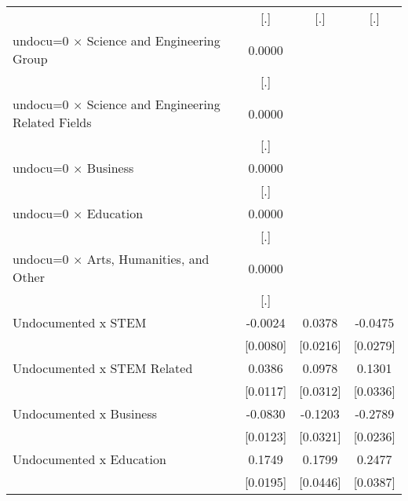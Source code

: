 \begin{table}[htbp]
\begin{tabular}{l*{3}{c}}
                    &         [.]         &         [.]         &         [.]         \\
\addlinespace
undocu=0 $\times$ Science and Engineering Group&      0.0000         &                     &                     \\
                    &         [.]         &                     &                     \\
\addlinespace
undocu=0 $\times$ Science and Engineering Related Fields&      0.0000         &                     &                     \\
                    &         [.]         &                     &                     \\
\addlinespace
undocu=0 $\times$ Business&      0.0000         &                     &                     \\
                    &         [.]         &                     &                     \\
\addlinespace
undocu=0 $\times$ Education&      0.0000         &                     &                     \\
                    &         [.]         &                     &                     \\
\addlinespace
undocu=0 $\times$ Arts, Humanities, and Other&      0.0000         &                     &                     \\
                    &         [.]         &                     &                     \\
\addlinespace
Undocumented x STEM &     -0.0024         &      0.0378\sym{*}  &     -0.0475\sym{*}  \\
                    &    [0.0080]         &    [0.0216]         &    [0.0279]         \\
\addlinespace
Undocumented x STEM Related&      0.0386\sym{***}&      0.0978\sym{***}&      0.1301\sym{***}\\
                    &    [0.0117]         &    [0.0312]         &    [0.0336]         \\
\addlinespace
Undocumented x Business&     -0.0830\sym{***}&     -0.1203\sym{***}&     -0.2789\sym{***}\\
                    &    [0.0123]         &    [0.0321]         &    [0.0236]         \\
\addlinespace
Undocumented x Education&      0.1749\sym{***}&      0.1799\sym{***}&      0.2477\sym{***}\\
                    &    [0.0195]         &    [0.0446]         &    [0.0387]         \\

\end{tabular}
\end{table}
